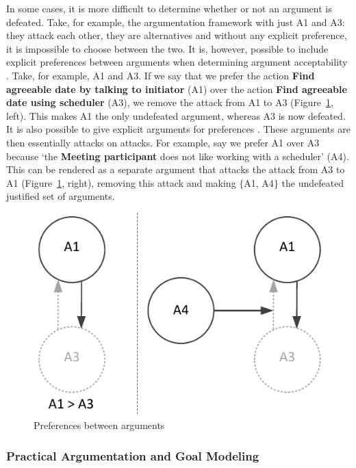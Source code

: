 \documentclass[11.5pt,two column]{llncs}
\begin{document}
In some cases, it is more difficult to determine whether or not an argument is defeated. Take, for example, the argumentation framework with just A1 and A3: they attack each other, they are alternatives and without any explicit preference, it is impossible to choose between the two. It is, however, possible to include explicit preferences between arguments when determining argument acceptability \cite{amgoud2002reasoning}. Take, for example, A1 and A3. If we say that we prefer the action \textbf{Find agreeable date by talking to initiator} (A1) over the action \textbf{Find agreeable date using scheduler} (A3), we remove the attack from A1 to A3 (Figure~\ref{fig:pras:example2}, left). This makes A1 the only undefeated argument, whereas A3 is now defeated. It is also possible to give explicit arguments for preferences \cite{modgil2009}. These arguments are then essentially attacks on attacks. For example, say we prefer A1 over A3 because `the \textbf{Meeting participant} does not like working with a scheduler' (A4). This can be rendered as a separate argument that attacks the attack from A3 to A1 (Figure~\ref{fig:pras:example2}, right), removing this attack and making $\{$A1, A4$\}$ the undefeated justified set of arguments.

\begin{figure}[ht]
\centering
\includegraphics[scale=0.8]{img/Fig2}
\caption{Preferences between arguments}
\label{fig:pras:example2}
\end{figure}  

\subsubsection{Practical Argumentation and Goal Modeling}
\label{sect:background:pras:motivation}
\end{document}
